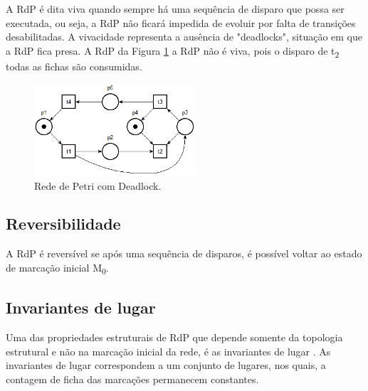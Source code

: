 A RdP \'e dita viva quando sempre h\'a uma sequ\^encia de disparo que possa ser executada, ou seja, a RdP n\~ao ficar\'a impedida de evoluir por falta de transi\c{c}\~oes desabilitadas. A vivacidade representa a aus\^encia de "deadlocks", situa\c{c}\~ao em que a RdP fica presa. A RdP da Figura \ref{fig:rdpdeadlock} a RdP n\~ao \'e viva, pois o disparo de t\textsubscript{2} todas as fichas s\~ao consumidas.

\begin{figure}[!htb]
	\caption[Rede de Petri com deadlock]{Rede de Petri com Deadlock.}
	\label{fig:rdpdeadlock}
	\includegraphics[width=6cm]{./figuras/RDP_DEADLOCK.png}\centering
\end{figure}

\subsection{Reversibilidade}

A RdP \'e revers\'ivel se ap\'os uma sequ\^encia de disparos, \'e poss\'ivel voltar ao estado de marca\c{c}\~ao inicial M\textsubscript{0}.

\subsection{Invariantes de lugar}

Uma das propriedades estruturais de RdP que depende somente da topologia estrutural e n\~ao na marca\c{c}\~ao inicial da rede, \'e as invariantes de lugar \cite{moody1998}. As invariantes de lugar correspondem a um conjunto de lugares, nos quais, a contagem de ficha das marca\c{c}\~oes permanecem constantes.



